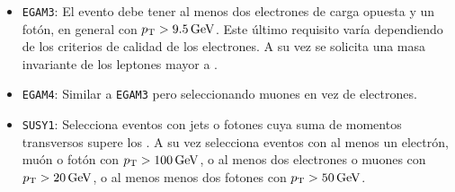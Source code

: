 \begin{itemize}
  \item \texttt{EGAM3}: El evento debe tener al menos dos electrones de carga opuesta y un fotón, en general con $p_{\text{T}}>9.5\,\text{GeV}$. Este último requisito varía dependiendo de los criterios de calidad de los electrones. A su vez se solicita una masa invariante de los leptones mayor a .
  \item \texttt{EGAM4}: Similar a \texttt{EGAM3} pero seleccionando muones en vez de electrones.
  \item \texttt{SUSY1}: Selecciona eventos con jets o fotones cuya suma de momentos transversos supere los . A su vez selecciona eventos con al menos un electrón, muón o fotón con $p_{\text{T}}>100\, \text{GeV}$, o al menos dos electrones o muones con $p_{\text{T}}>20\,\text{GeV}$, o al menos menos dos fotones con $p_{\text{T}}>50\, \text{GeV}$.
\end{itemize}








